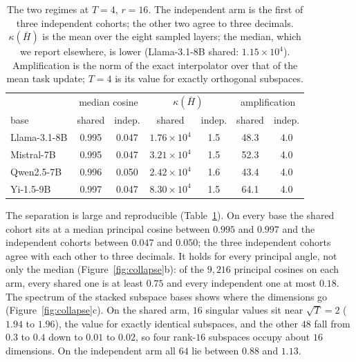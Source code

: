 \begin{table}[pos=tbp]
\centering
\small
\caption{The two regimes at $T = 4$, $r = 16$. The independent arm is the
first of three independent cohorts; the other two agree to three decimals.
$\kappa(\bar H)$ is the mean over the eight sampled layers; the median, which
we report elsewhere, is lower (Llama-3.1-8B shared: $1.15\times10^{4}$).
Amplification is the norm of the exact interpolator over that of the mean task
update; $T = 4$ is its value for exactly orthogonal subspaces.}
\label{tab:regimes}
\begin{tabular}{lcccccc}
\toprule
 & \multicolumn{2}{c}{median cosine} & \multicolumn{2}{c}{$\kappa(\bar H)$}
 & \multicolumn{2}{c}{amplification} \\
base & shared & indep. & shared & indep. & shared & indep. \\
\midrule
Llama-3.1-8B & 0.995 & 0.047 & $1.76\times10^{4}$ & 1.5 & 48.3 & 4.0 \\
Mistral-7B   & 0.995 & 0.047 & $3.21\times10^{4}$ & 1.5 & 52.3 & 4.0 \\
Qwen2.5-7B   & 0.996 & 0.050 & $2.42\times10^{4}$ & 1.6 & 43.4 & 4.0 \\
Yi-1.5-9B    & 0.997 & 0.047 & $8.30\times10^{4}$ & 1.5 & 64.1 & 4.0 \\
\bottomrule
\end{tabular}
\end{table}

The separation is large and reproducible (Table~\ref{tab:regimes}). On every
base the shared cohort sits at a median principal cosine between $0.995$ and
$0.997$ and the independent cohorts between $0.047$ and $0.050$; the three
independent cohorts agree with each other to three decimals. It holds for every
principal angle, not only the median (Figure~\ref{fig:collapse}b): of the
$9{,}216$ principal cosines on each arm, every shared one is at least $0.75$
and every independent one at most $0.18$. The spectrum of the stacked subspace
bases shows where the dimensions go (Figure~\ref{fig:collapse}c). On the
shared arm, $16$ singular values sit near $\sqrt{T} = 2$ ($1.94$ to $1.96$),
the value for exactly identical subspaces, and the other $48$ fall from $0.3$
to $0.4$ down to $0.01$ to $0.02$, so four rank-$16$ subspaces occupy about
$16$ dimensions. On the independent arm all $64$ lie between $0.88$ and
$1.13$.

